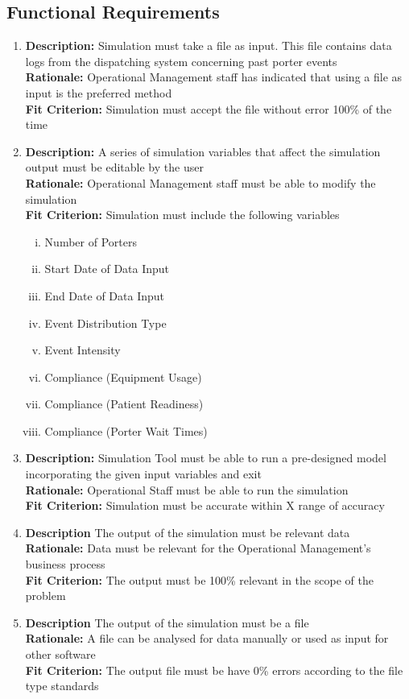 \documentclass[paper=letter, fontsize=10pt]{scrartcl}
\numberwithin{equation}{section}		%
\numberwithin{figure}{section}			%
\numberwithin{table}{section}				%
\begin{document}
\subsection{Functional Requirements}
\begin{enumerate}
	\item \textbf{Description:} Simulation must take a file as input. This file contains data logs from the dispatching system concerning past porter events
	\\ \textbf{Rationale:} Operational Management staff has indicated that using a file as input is the preferred method 
	\\ \textbf{Fit Criterion:} Simulation must accept the file without error 100\% of the time
	\item \textbf{Description:} A series of simulation variables that affect the simulation output must be editable by the user
	\\ \textbf{Rationale:} Operational Management staff must be able to modify the simulation
	\\ \textbf{Fit Criterion:} Simulation must include the following variables   
	\begin{enumerate}[(i)]
		\item Number of Porters
		\item Start Date of Data Input
		\item End Date of Data Input
		\item Event Distribution Type
		\item Event Intensity
		\item Compliance (Equipment Usage)
		\item Compliance (Patient Readiness)
		\item Compliance (Porter Wait Times)
	\end{enumerate}
	\item \textbf{Description:} Simulation Tool must be able to run a pre-designed model incorporating the given input variables and exit
	\\ \textbf{Rationale:} Operational Staff must be able to run the simulation
	\\ \textbf{Fit Criterion:} Simulation must be accurate within X range of accuracy
	\item \textbf{Description} The output of the simulation must be relevant data
	\\ \textbf{Rationale:} Data must be relevant for the Operational Management's business process
	\\ \textbf{Fit Criterion:} The output must be 100\% relevant in the scope of the problem
	\item \textbf{Description} The output of the simulation must be a file
	\\ \textbf{Rationale:} A file can be analysed for data manually or used as input for other software
	\\ \textbf{Fit Criterion:} The output file must be have 0\% errors according to the file type standards 
\end{enumerate}
\end{document}

